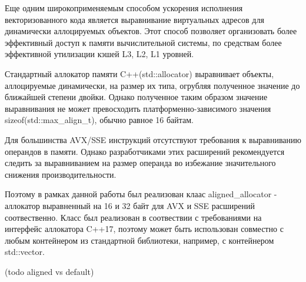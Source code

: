 Еще одним широкоприменяемым способом ускорения исполнения векторизованного кода является выравнивание виртуальных адресов
для динамически аллоцируемых объектов. Этот способ позволяет организовать более эффективный доступ к памяти вычислительной системы,
по средствам более эффективной утилизации кэшей L3, L2, L1 уровней.

Стандартный аллокатор памяти C++(std::allocator) выравнивает объекты, аллоцируемые динамически, на размер их типа,
огрубляя полученное значение до ближайшей степени двойки.
Однако полученное таким образом значение выравнивания не может превосходить платформенно-зависимого значения sizeof(std::max\_align\_t),
обычно равное 16 байтам.

Для большинства AVX/SSE инструкций отсутствуют требования к выравниванию операндов в памяти. 
Однако разработчиками этих расширений рекомендуется следить за выравниванием на размер операнда
во избежание значительного снижения производительности.

Поэтому в рамках данной работы был реализован клаас aligned\_allocator - аллокатор выравненный
на 16 и 32 байт для AVX и SSE расширений соотвественно.
Класс был реализован в соотвествии с требованиями на интерфейс аллокатора C++17, поэтому может быть использован совместно с любым
контейнером из стандартной библиотеки, например, с контейнером std::vector.

(todo aligned vs default)

\clearpage